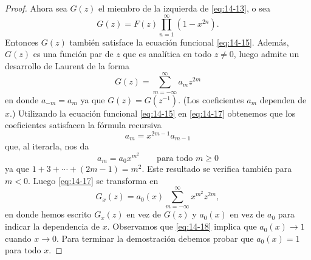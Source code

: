 \documentclass[12pt,a4paper]{book}
\begin{document}
\begin{proof}
        Ahora sea $G(z)$ el miembro de la izquierda de \eqref{eq:14-13}, o sea
        \begin{equation}\label{eq:14-16}
            G(z)=F(z)\prod_{n=1}^{\infty}(1-x^{2n}).
        \end{equation}
        Entonces $G(z)$ también satisface la ecuación funcional \eqref{eq:14-15}. Además, $G(z)$
        es una función par de $z$ que es analítica en todo $z\neq0$, luego admite un desarrollo
        de Laurent de la forma
        \begin{equation}\label{eq:14-17}
            G(z)=\sum_{m=-\infty}^{\infty}a_{m}z^{2m}
        \end{equation}
        en donde $a_{-m}=a_{m}$ ya que $G(z)=G(z^{-1})$. (Los coeficientes $a_{m}$ dependen de $x$.)
        Utilizando la ecuación funcional \eqref{eq:14-15} en \eqref{eq:14-17} obtenemos que los
        coeficientes satisfacen la fórmula recursiva
        \begin{equation*}
            a_{m}=x^{2m-1}a_{m-1}
        \end{equation*}
        que, al iterarla, nos da
        \begin{equation*}
            a_{m}=a_{0}x^{m^{2}}\qquad\text{para todo }m\geq0
        \end{equation*}
        ya que $1+3+\cdots+(2m-1)=m^{2}$. Este resultado se verifica también para $m<0$. Luego
        \eqref{eq:14-17} se transforma en
        \begin{equation}\label{eq:14-18}
            G_{x}(z)=a_{0}(x)\sum_{m=-\infty}^{\infty}x^{m^{2}}z^{2m},
        \end{equation}
        en donde hemos escrito $G_{x}(z)$ en vez de $G(z)$ y $a_{0}(x)$ en vez de $a_{0}$ para indicar
        la dependencia de $x$. Observamos que \eqref{eq:14-18} implica que $a_{0}(x)\to1$ cuando
        $x\to0$. Para terminar la demostración debemos probar que $a_{0}(x)=1$ para todo $x$.


\end{proof}
\end{document}
